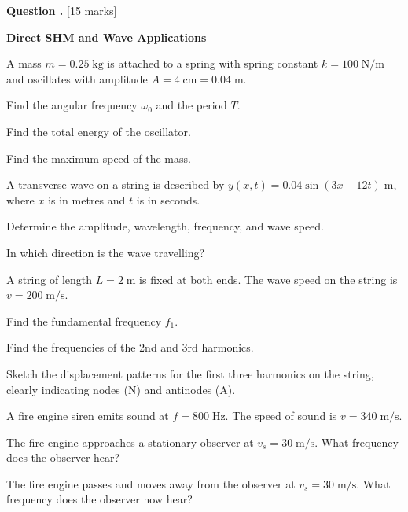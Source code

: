 \documentclass[12pt,a4paper]{article}
\newcounter{questioncounter}
\newcommand{\question}[1]{%
  \stepcounter{questioncounter}%
  \vspace{0.5cm}%
  \noindent\textbf{Question \thequestioncounter.} \hfill [#1 marks]%
  \vspace{0.2cm}%
  \par%
}
\begin{document}
\newpage

\question{15}

\noindent\textbf{Direct SHM and Wave Applications}

\begin{parts}
\item A mass $m = 0.25\;\text{kg}$ is attached to a spring with spring constant $k = 100\;\text{N/m}$ and oscillates with amplitude $A = 4\;\text{cm} = 0.04\;\text{m}$.
\begin{parts}
\item Find the angular frequency $\omega_0$ and the period $T$. 
\item Find the total energy of the oscillator. 
\item Find the maximum speed of the mass. 
\end{parts}

\item A transverse wave on a string is described by $y(x,t) = 0.04\sin(3x - 12t)\;\text{m}$, where $x$ is in metres and $t$ is in seconds.
\begin{parts}
\item Determine the amplitude, wavelength, frequency, and wave speed. 
\item In which direction is the wave travelling? 
\end{parts}

\item A string of length $L = 2\;\text{m}$ is fixed at both ends. The wave speed on the string is $v = 200\;\text{m/s}$.
\begin{parts}
\item Find the fundamental frequency $f_1$. 
\item Find the frequencies of the 2nd and 3rd harmonics. 
\item Sketch the displacement patterns for the first three harmonics on the string, clearly indicating nodes (N) and antinodes (A). 
\end{parts}

\item A fire engine siren emits sound at $f = 800\;\text{Hz}$. The speed of sound is $v = 340\;\text{m/s}$.
\begin{parts}
\item The fire engine approaches a stationary observer at $v_s = 30\;\text{m/s}$. What frequency does the observer hear? 
\item The fire engine passes and moves away from the observer at $v_s = 30\;\text{m/s}$. What frequency does the observer now hear? 
\end{parts}
\end{parts}
\end{document}
